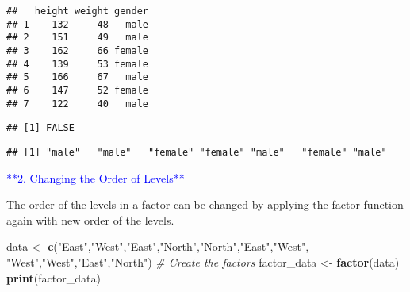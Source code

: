 \documentclass[
]{article}
\newenvironment{Shaded}{\begin{snugshade}}{\end{snugshade}}
\newcommand{\CommentTok}[1]{\textcolor[rgb]{0.56,0.35,0.01}{\textit{#1}}}
\newcommand{\FunctionTok}[1]{\textcolor[rgb]{0.13,0.29,0.53}{\textbf{#1}}}
\newcommand{\NormalTok}[1]{#1}
\newcommand{\OtherTok}[1]{\textcolor[rgb]{0.56,0.35,0.01}{#1}}
\newcommand{\SpecialCharTok}[1]{\textcolor[rgb]{0.81,0.36,0.00}{\textbf{#1}}}
\newcommand{\StringTok}[1]{\textcolor[rgb]{0.31,0.60,0.02}{#1}}
\begin{document}
\begin{verbatim}
##   height weight gender
## 1    132     48   male
## 2    151     49   male
## 3    162     66 female
## 4    139     53 female
## 5    166     67   male
## 6    147     52 female
## 7    122     40   male
\end{verbatim}

\begin{Shaded}
\end{Shaded}

\begin{verbatim}
## [1] FALSE
\end{verbatim}

\begin{Shaded}
\end{Shaded}

\begin{verbatim}
## [1] "male"   "male"   "female" "female" "male"   "female" "male"
\end{verbatim}

\textcolor{blue}{**2. Changing the Order of Levels**}

The order of the levels in a factor can be changed by applying the
factor function again with new order of the levels.

\begin{Shaded}
\begin{Highlighting}[]
\NormalTok{data }\OtherTok{\textless{}{-}} \FunctionTok{c}\NormalTok{(}\StringTok{"East"}\NormalTok{,}\StringTok{"West"}\NormalTok{,}\StringTok{"East"}\NormalTok{,}\StringTok{"North"}\NormalTok{,}\StringTok{"North"}\NormalTok{,}\StringTok{"East"}\NormalTok{,}\StringTok{"West"}\NormalTok{,}
   \StringTok{"West"}\NormalTok{,}\StringTok{"West"}\NormalTok{,}\StringTok{"East"}\NormalTok{,}\StringTok{"North"}\NormalTok{)}
\CommentTok{\# Create the factors}
\NormalTok{factor\_data }\OtherTok{\textless{}{-}} \FunctionTok{factor}\NormalTok{(data)}
\FunctionTok{print}\NormalTok{(factor\_data)}
\end{Highlighting}
\end{Shaded}
\end{document}
